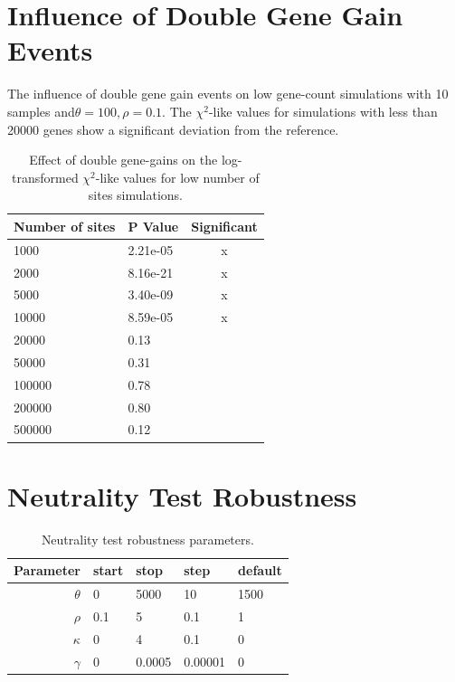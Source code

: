 \section{Influence of Double Gene Gain Events}\label{app:double-p-value}
The influence of double gene gain events on low gene-count simulations with 10 samples and$\theta = 100, \rho = 0.1$.
The $\chi^2$-like values for simulations with less than 20000 genes show a significant deviation from the reference.

\begin{table}[H]
    \begin{tabular}{l|l|c}
        Number of sites & P Value  & Significant \\
        \hline
        1000            & 2.21e-05 & x           \\
        2000            & 8.16e-21 & x           \\
        5000            & 3.40e-09 & x           \\
        10000           & 8.59e-05 & x           \\
        20000           & 0.13     &             \\
        50000           & 0.31     &             \\
        100000          & 0.78     &             \\
        200000          & 0.80     &             \\
        500000          & 0.12     &
    \end{tabular}
    \caption{Effect of double gene-gains on the log-transformed $\chi^2$-like values for low number of sites simulations.}
\end{table}
\newpage
\section{Neutrality Test Robustness}
\begin{table}[h]
    \centering
    \begin{tabular}{r|llll}
        Parameter & start & stop   & step    & default \\
        \hline
        $\theta$  & 0     & 5000   & 10      & 1500    \\
        $\rho$    & 0.1   & 5      & 0.1     & 1       \\
        $\kappa$  & 0     & 4      & 0.1     & 0       \\
        $\gamma$  & 0     & 0.0005 & 0.00001 & 0
    \end{tabular}
    \caption{Neutrality test robustness parameters.}
    \label{app:robust-param}
\end{table}

